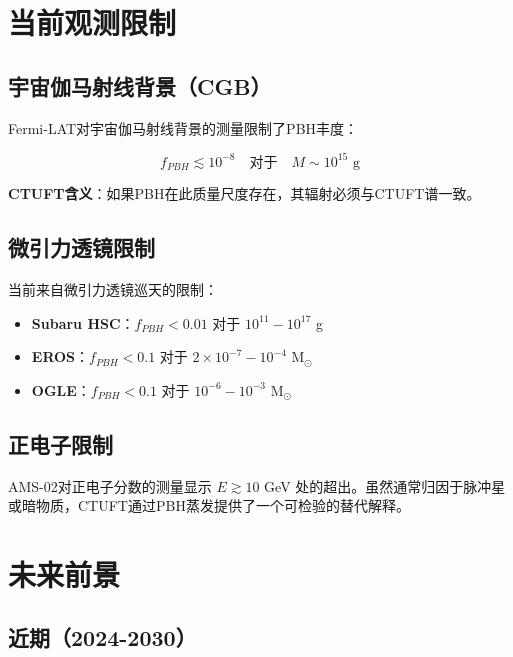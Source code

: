 \section{当前观测限制}
\label{sec:current-constraints}

\subsection{宇宙伽马射线背景（CGB）}
\label{subsec:cgb-constraints}

Fermi-LAT对宇宙伽马射线背景的测量限制了PBH丰度：

\begin{equation}
f_{PBH} \lesssim 10^{-8} \quad \text{对于} \quad M \sim 10^{15} \text{ g}
\label{eq:cgb-constraint}
\end{equation}

\textbf{CTUFT含义}：如果PBH在此质量尺度存在，其辐射必须与CTUFT谱一致。

\subsection{微引力透镜限制}
\label{subsec:microlensing-constraints}

当前来自微引力透镜巡天的限制：

\begin{itemize}
    \item \textbf{Subaru HSC}：$f_{PBH} < 0.01$ 对于 $10^{11} - 10^{17}$ g
    \item \textbf{EROS}：$f_{PBH} < 0.1$ 对于 $2\times10^{-7} - 10^{-4}$ M$_\odot$
    \item \textbf{OGLE}：$f_{PBH} < 0.1$ 对于 $10^{-6} - 10^{-3}$ M$_\odot$
\end{itemize}

\subsection{正电子限制}
\label{subsec:positron-constraints}

AMS-02对正电子分数的测量显示 $E \gtrsim 10$ GeV 处的超出。虽然通常归因于脉冲星或暗物质，CTUFT通过PBH蒸发提供了一个可检验的替代解释。

\section{未来前景}
\label{sec:future-prospects}

\subsection{近期（2024-2030）}
\label{subsec:near-term}

